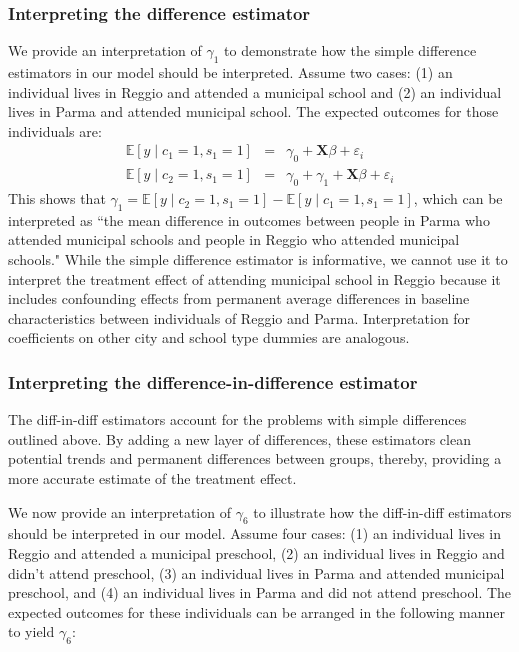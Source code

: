 \documentclass[11pt]{article}
\begin{document}
\subsubsection{Interpreting the difference estimator}

We provide an interpretation of $\gamma_1$ to demonstrate how the simple difference estimators in our model should be interpreted. Assume two cases: (1) an individual lives in Reggio and attended a municipal school and (2) an individual lives in Parma and attended municipal school. The expected outcomes for those individuals are:
\begin{eqnarray*}  
    \mathbb{E}[y \mid c_1 = 1, s_1 = 1] & = & \gamma_0 + \mathbf{X}\beta + \varepsilon_i \\
    \mathbb{E}[y \mid c_2 = 1, s_1 = 1] & = & \gamma_0 + \gamma_1 + \mathbf{X}\beta + \varepsilon_i      
\end{eqnarray*}
This shows that $\gamma_1 = \mathbb{E}[y \mid c_2 = 1, s_1 = 1] - \mathbb{E}[y \mid c_1 = 1, s_1 = 1]$, which can be interpreted as ``the mean difference in outcomes between people in Parma who attended municipal schools and people in Reggio who attended municipal schools." While the simple difference estimator is informative, we cannot use it to interpret the treatment effect of attending municipal school in Reggio because it includes confounding effects from permanent average differences in baseline characteristics between individuals of Reggio and Parma. Interpretation for coefficients on other city and school type dummies are analogous.


\subsubsection{Interpreting the difference-in-difference estimator}
The diff-in-diff estimators account for the problems with simple differences outlined above. By adding a new layer of differences, these estimators clean potential trends and permanent differences between groups, thereby, providing a more accurate estimate of the treatment effect.

We now provide an interpretation of $\gamma_6$ to illustrate how the diff-in-diff estimators should be interpreted in our model. Assume four cases: (1) an individual lives in Reggio and attended a municipal preschool, (2) an individual lives in Reggio and didn't attend preschool, (3) an individual lives in Parma and attended municipal preschool, and (4) an individual lives in Parma and did not attend preschool. The expected outcomes for these individuals can be arranged in the following manner to yield $\gamma_6$:
\end{document}

